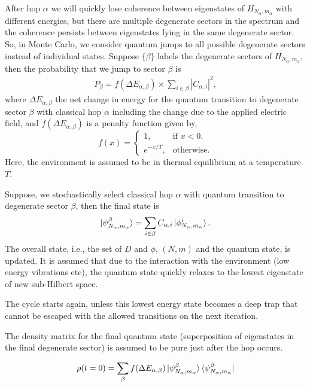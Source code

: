 \documentclass[a4paper,twocolumn]{revtex4-1} %
\begin{document}
After hop $\alpha$ we will quickly lose coherence between eigenstates 
of $H_{N_{\alpha},m_{\alpha}}$ with different 
energies, but
there are multiple degenerate sectors in the spectrum 
and 
 the coherence persists between
 eigenstates lying in the same degenerate sector.
So, in Monte Carlo, we consider quantum jumps to all possible degenerate sectors
instead of individual states.
Suppose $\{\beta\}$ labels the degenerate sectors
of $H_{N_{\alpha},m_{\alpha}}$, then
the probability that we jump to sector $\beta$
is
\begin{gather}
P_\beta = f(\Delta E_{\alpha,\beta}) \times \sum_{i\in\beta} |C_{\alpha,i}|^2,
\end{gather}
where 
$\Delta E_{\alpha,\beta}$ the net change in energy
for the quantum transition to degenerate sector $\beta$ with classical hop $\alpha$
 including the change due to the applied electric field,
 and 
 $f(\Delta E_{\alpha,\beta})$ is a penalty function given by,
\begin{equation}
\nonumber
  f(x)=\begin{cases}
    1, & \text{if $x<0$}.\\
    e^{-x/{T}}, & \text{otherwise}.
  \end{cases}
\end{equation}
Here, the environment is assumed to be in thermal equilibrium at
a temperature $T$.

Suppose, we stochastically select 
classical hop $\alpha$ with quantum transition to degenerate sector $\beta$,
 then
the final state is
\begin{gather}
\ket{\psi^{\beta}_{N_{\alpha},m_{\alpha}}}= \sum_{i\in\beta} C_{\alpha,i} \ket{\phi_{N_{\alpha},m_{\alpha}}^i}.
\end{gather}
The overall state, i.e., the set of $D$ and $\phi$, $(N,m)$ and the quantum state, is updated. 
It is assumed that due to the interaction with the environment (low energy vibrations etc), 
the quantum state quickly relaxes to the lowest eigenstate of new sub-Hilbert space.

The cycle starts again,
unless this lowest energy state becomes a deep trap that cannot be escaped with the allowed transitions on the next iteration.

The density matrix for the final quantum state 
(superposition of eigenstates in the final degenerate sector)
is assumed to be pure just after the hop occurs. 


\begin{gather}
\rho(t=0) = \sum_{\beta}
f(\Delta E_{\alpha,\beta})
\ket{\psi^{\beta}_{N_{\alpha},m_{\alpha}}}
\bra{\psi^{\beta}_{N_{\alpha},m_{\alpha}}}
\end{gather}
\end{document}

